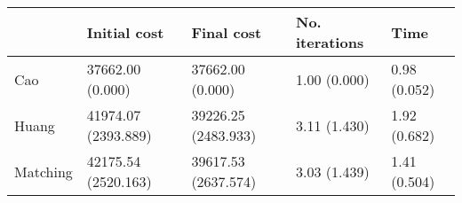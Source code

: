 \begin{tabular}{lllll}
\toprule
{} &         Initial cost &           Final cost & No. iterations &          Time \\
\midrule
Cao      &     37662.00 (0.000) &     37662.00 (0.000) &   1.00 (0.000) &  0.98 (0.052) \\
Huang    &  41974.07 (2393.889) &  39226.25 (2483.933) &   3.11 (1.430) &  1.92 (0.682) \\
Matching &  42175.54 (2520.163) &  39617.53 (2637.574) &   3.03 (1.439) &  1.41 (0.504) \\
\bottomrule
\end{tabular}
